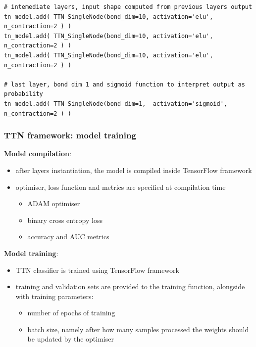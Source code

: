 \documentclass[xcolor=table,8pt]{beamer}
\begin{document}
\begin{frame}[t, fragile]
\begin{lstlisting}
# intemediate layers, input shape computed from previous layers output
tn_model.add( TTN_SingleNode(bond_dim=10, activation='elu',     n_contraction=2 ) )
tn_model.add( TTN_SingleNode(bond_dim=10, activation='elu',     n_contraction=2 ) )
tn_model.add( TTN_SingleNode(bond_dim=10, activation='elu',     n_contraction=2 ) )

# last layer, bond dim 1 and sigmoid function to interpret output as probability
tn_model.add( TTN_SingleNode(bond_dim=1,  activation='sigmoid', n_contraction=2 ) )
        \end{lstlisting}
    \end{frame}
    

    \begin{frame}[t, fragile]
        \frametitle{TTN framework: model training}

        \textbf{Model compilation}:
        \begin{itemize}
            \item after layers instantiation, the model is compiled inside TensorFlow framework
            \item optimiser, loss function and metrics are specified at compilation time
            \begin{itemize}
                \item \alert{ADAM} optimiser
                \item \alert{binary cross entropy} loss
                \item \alert{accuracy} and \alert{AUC} metrics
            \end{itemize}
        \end{itemize}
        
        \medskip
        \textbf{Model training}:
        \begin{itemize}
            \item TTN classifier is trained using TensorFlow framework
            \item training and validation sets are provided to the training function, alongside with training parameters:
            \begin{itemize}
                \item number of \alert{epochs} of training
                \item \alert{batch size}, namely after how many samples processed the weights should be updated by the optimiser
            \end{itemize}
        \end{itemize}


\end{frame}
\end{document}
